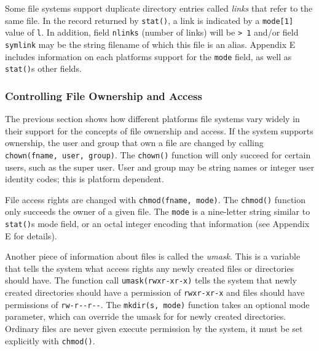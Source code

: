 Some file systems support duplicate directory entries called
\textit{links} that refer to the same file. In the record returned by
\texttt{stat()}, a link is indicated by a
\texttt{mode[1]} value of \texttt{{\textquotedbl}l{\textquotedbl}}. In
addition, field \texttt{nlinks} ({\textquotedbl}number of
links{\textquotedbl}) will be \texttt{{\textgreater} 1} and/or field
\texttt{symlink} may be the string filename of which this file is an
alias. Appendix E includes information on each
platform{\textquotesingle}s support for the \texttt{mode} field, as
well as \texttt{stat()}{\textquotesingle}s other fields.

\subsubsection[Controlling File Ownership and Access]{Controlling File
Ownership and Access}

The previous section shows how different
platforms{\textquotesingle} file systems vary widely in their support
for the concepts of file ownership and access. If the system supports
ownership, the user and group that own a file are changed by calling
\texttt{chown(fname, user, group)}. The \texttt{chown()}
function will only succeed for certain users, such as the super user.
User and group may be string names or integer user identity codes; this
is platform dependent.

File access rights are changed with \texttt{chmod(fname, mode)}. The
\texttt{chmod()} function only succeeds the owner of a
given file. The \texttt{mode} is a nine-letter string similar to
\texttt{stat()}{\textquotesingle}s mode field, or an octal integer
encoding that information (see Appendix E for details).

Another piece of information about files is called the
\textit{umask}. This is a variable that tells the system
what access rights any newly created files or directories should have.
The function call
\texttt{umask({\textquotedbl}rwxr-xr-x{\textquotedbl})} tells the
system that newly created directories should have a permission of
\texttt{{\textquotedbl}rwxr-xr-x{\textquotedbl}} and files should have
permissions of \texttt{{\textquotedbl}rw-r-{}-r-{}-{\textquotedbl}}.
The \texttt{mkdir(s, mode)} function takes an optional mode parameter,
which can override the umask for for newly created directories.
Ordinary files are never given execute permission by the system, it
must be set explicitly with \texttt{chmod()}.


